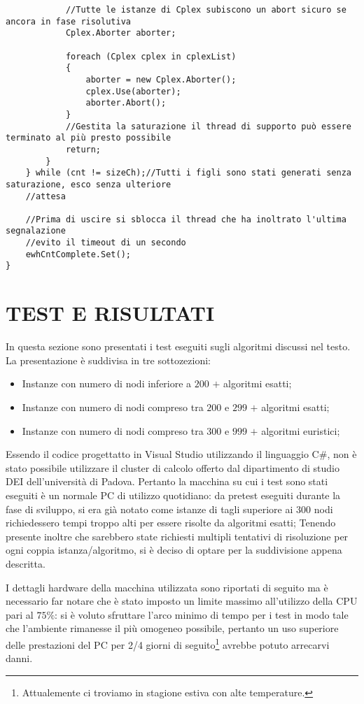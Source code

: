 \documentclass[11pt]{article}
\begin{document}
\begin{lstlisting}
            //Tutte le istanze di Cplex subiscono un abort sicuro se ancora in fase risolutiva
            Cplex.Aborter aborter;

            foreach (Cplex cplex in cplexList)
            {
                aborter = new Cplex.Aborter();
                cplex.Use(aborter);
                aborter.Abort();
            }
            //Gestita la saturazione il thread di supporto può essere terminato al più presto possibile
            return;
        }
    } while (cnt != sizeCh);//Tutti i figli sono stati generati senza saturazione, esco senza ulteriore
    //attesa
    
    //Prima di uscire si sblocca il thread che ha inoltrato l'ultima segnalazione
    //evito il timeout di un secondo
    ewhCntComplete.Set();
}

\end{lstlisting}

\section*{TEST E RISULTATI}
\label{sec:TestRisultatiS}

In questa sezione sono presentati i test eseguiti sugli algoritmi discussi nel testo. La presentazione è suddivisa in tre sottozezioni:
\begin{itemize}
    \item Instanze con numero di nodi inferiore a \textbf{$200$} $+$ algoritmi esatti;
    \item Instanze con numero di nodi compreso tra \textbf{$200$} e \textbf{$299$} $+$ algoritmi esatti;
    \item Instanze con numero di nodi compreso tra \textbf{$300$} e \textbf{$999$} $+$ algoritmi euristici;
\end{itemize}
Essendo il codice progettatto in Visual Studio utilizzando il linguaggio C\#, non è stato possibile utilizzare il cluster di calcolo offerto dal dipartimento di studio DEI dell'università di Padova. Pertanto la macchina su cui i test sono stati eseguiti è un normale PC di utilizzo quotidiano: da pretest eseguiti durante la fase di sviluppo, si era già notato come istanze di tagli superiore ai $300$ nodi richiedessero tempi troppo alti per essere risolte da algoritmi esatti; Tenendo presente inoltre che sarebbero state richiesti multipli tentativi di risoluzione per ogni coppia istanza/algoritmo, si è deciso di optare per la suddivisione appena descritta.

I dettagli hardware della macchina utilizzata sono riportati di seguito ma è necessario far notare che è stato imposto un limite massimo all'utilizzo della CPU pari al $75\%$: si è voluto sfruttare l'arco minimo di tempo per i test in modo tale che l'ambiente rimanesse il più omogeneo possibile, pertanto un uso superiore delle prestazioni del PC per 2/4 giorni di seguito\footnote{Attualemente ci troviamo in stagione estiva con alte temperature.} avrebbe potuto arrecarvi danni.
\end{document}
